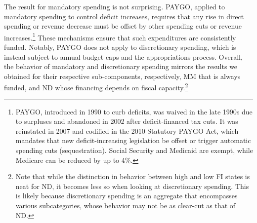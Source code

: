 \documentclass[12pt]{article}%
\theoremstyle{remark}
\begin{document}
The result for mandatory spending is not surprising. PAYGO, applied to mandatory spending to control deficit increases, requires that any rise in direct spending or revenue decrease must be offset by other spending cuts or revenue increases.\footnote{PAYGO, introduced in 1990 to curb deficits, was waived in the late 1990s due to surpluses and abandoned in 2002 after deficit-financed tax cuts. It was reinstated in 2007 and codified in the 2010 Statutory PAYGO Act, which mandates that new deficit-increasing legislation be offset or trigger automatic spending cuts (sequestration). Social Security and Medicaid are exempt, while Medicare can be reduced by up to 4\%. } These mechanisms ensure that such expenditures are consistently funded. Notably, PAYGO does not apply to discretionary spending, which is instead subject to annual budget caps and the appropriations process.
Overall, the behavior of mandatory and discretionary spending mirrors the results we obtained for their respective sub-components, respectively, MM that is always funded, and ND whose financing depends on fiscal capacity.\footnote{Note that while the distinction in behavior between high and low FI states is neat for ND, it becomes less so when looking at discretionary spending. This is likely because discretionary spending is an aggregate that encompasses various subcategories, whose behavior may not be as clear-cut as that of ND.}


\end{document}
